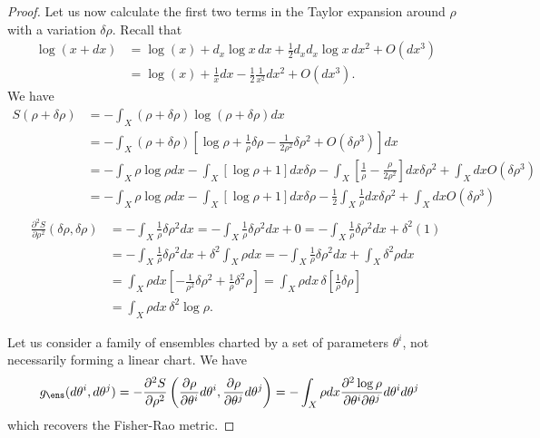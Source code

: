 \begin{mathSection}
\begin{proof}
	Let us now calculate the first two terms in the Taylor expansion around $\rho$ with a variation $\delta\rho$. Recall that
	\begin{equation}
		\begin{aligned}
			\log(x+dx) &= \log(x) + d_x \log x \, dx + \frac{1}{2} d_x d_x  \log x \, dx^2 + O(dx^3) \\
			&= \log(x) + \frac{1}{x} dx - \frac{1}{2} \frac{1}{x^2} dx^2 + O(dx^3).
		\end{aligned}
	\end{equation}
	We have
	\begin{equation}
		\begin{aligned}
			S(\rho + \delta \rho) &= -\int_X (\rho + \delta \rho) \log (\rho + \delta \rho) dx \\
			&=-\int_X (\rho + \delta \rho) \left[\log \rho + \frac{1}{\rho} \delta \rho - \frac{1}{2\rho^2} \delta \rho^2 + O(\delta \rho^3)\right] dx \\
			&= - \int_X \rho \log \rho dx - \int_X \left[\log \rho + 1 \right]dx \delta \rho -\int_X \left[\frac{1}{\rho} - \frac{\rho}{2\rho^2}\right] dx \delta \rho^2 + \int_X dx O(\delta\rho^3) \\
			&= - \int_X \rho \log \rho dx - \int_X \left[\log \rho + 1 \right]dx \delta \rho - 	
			\frac{1}{2}\int_X \frac{1}{\rho} dx \delta \rho^2 + \int_X dx O(\delta\rho^3) \\
		\end{aligned}
	\end{equation}
	\begin{equation}
		\begin{aligned}
			\frac{\partial^2 S}{\partial \rho^2}(\delta \rho, \delta \rho) &= -\int_X \frac{1}{\rho} \delta \rho^2 dx = -\int_X \frac{1}{\rho} \delta \rho^2 dx + 0 = -\int_X \frac{1}{\rho} \delta \rho^2 dx + \delta^2 (1) \\
			&= -\int_X \frac{1}{\rho} \delta \rho^2 dx + \delta^2 \int_X \rho dx = -\int_X \frac{1}{\rho} \delta \rho^2 dx + \int_X \delta^2 \rho dx \\
			&= \int_X \rho dx \left[-\frac{1}{\rho^2} \delta \rho^2 + \frac{1}{\rho} \delta^2 \rho \right]
			= \int_X \rho dx \, \delta \left[\frac{1}{\rho} \delta \rho \right] \\
			&= \int_X \rho dx \, \delta^2 \log \rho.
		\end{aligned}
	\end{equation}
	
	Let us consider a family of ensembles charted by a set of parameters $\theta^i$, not necessarily forming a linear chart. We have
	\begin{equation}
		\begin{aligned}
			g_{\ens}(d\theta^i, d\theta^j) &= - \frac{\partial^2 S}{\partial \rho^2}\left(\frac{\partial 
				\rho}{\partial \theta^i} d\theta^i, \frac{\partial 
				\rho}{\partial \theta^j} d\theta^j\right) = - \int_X \rho dx \frac{\partial^2 \log \rho}{\partial \theta^i \partial \theta^j}d\theta^i d\theta^j
		\end{aligned}
	\end{equation}
	which recovers the Fisher-Rao metric.
	

\end{proof}
\end{mathSection}
